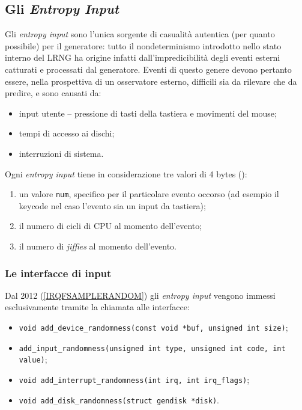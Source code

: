 \documentclass{article}
\begin{document}
 \subsection{Gli \emph{Entropy Input}}\label{entropyInputs}
 Gli \emph{entropy input} sono l'unica sorgente di casualità autentica (per
 quanto possibile) per il generatore: tutto il nondeterminismo introdotto
 nello stato interno del LRNG ha origine infatti dall'impredicibilità degli
 eventi esterni catturati e processati dal generatore.
 Eventi di questo genere devono pertanto essere, nella prospettiva di un
 osservatore esterno, difficili sia da rilevare che da predire, e sono causati
 da:
 \begin{itemize}
   \item input utente -- pressione di tasti della tastiera e movimenti del
   mouse;
   \item tempi di accesso ai dischi;
   \item interruzioni di sistema.
 \end{itemize}
 Ogni \emph{entropy input} tiene in considerazione tre valori di 4 bytes
 (\cite{lach}):
 \begin{enumerate}
   \item un valore \verb+num+, specifico per il particolare evento occorso (ad
   esempio il keycode nel caso l'evento sia un input da tastiera);
   \item il numero di cicli di CPU al momento dell'evento;
   \item il numero di \emph{jiffies} al momento dell'evento.
 \end{enumerate}
 \subsubsection{Le interfacce di input}\label{interfacceinput}
 Dal 2012 (\ref{IRQFSAMPLERANDOM}) gli \emph{entropy input} vengono immessi
 esclusivamente tramite la chiamata alle interfacce:
 \begin{itemize}
   \item \verb+void add_device_randomness(const void *buf, unsigned int size)+;
   \item \verb+add_input_randomness(unsigned int type, unsigned int code, int value)+;
   \item \verb+void add_interrupt_randomness(int irq, int irq_flags)+;
   \item \verb+void add_disk_randomness(struct gendisk *disk)+.
 \end{itemize}
 
\end{document}
